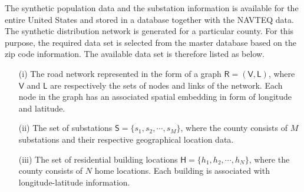 The synthetic population data and the substation information is available for the entire United States and stored in a database together with the NAVTEQ data. The synthetic distribution network is generated for a particular county. For this purpose, the required data set is selected from the master database based on the zip code information. The available data set is therefore listed as below.
\begin{enumerate}
	\item[(i)] The road network represented in the form of a graph $\mathsf{R}=(\mathsf{V},\mathsf{L})$, where $\mathsf{V}$ and $\mathsf{L}$ are respectively the sets of nodes and links of the network. Each node in the graph has an associated spatial embedding in form of longitude and latitude. 
	\item[(ii)] The set of substations $\mathsf{S}=\{s_1,s_2,\cdots,s_M\}$, where the county consists of $M$ substations and their respective geographical location data.
	\item[(iii)] The set of residential building locations $\mathsf{H}=\{h_1,h_2,\cdots,h_N\}$, where the county consists of $N$ home locations. Each building is associated with longitude-latitude information.
\end{enumerate}

